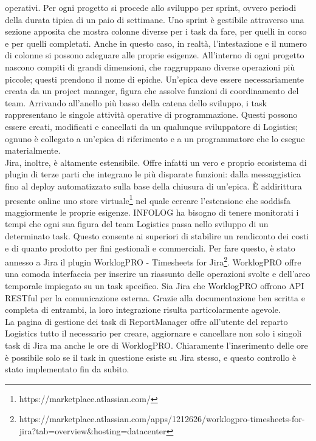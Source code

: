 operativi.
Per ogni progetto si procede allo sviluppo per sprint, ovvero periodi della durata tipica di un paio di settimane.
Uno sprint è gestibile attraverso una sezione apposita che mostra colonne diverse per i task da fare, per quelli in corso e per quelli completati.
Anche in questo caso, in realtà, l'intestazione e il numero di colonne si possono adeguare alle proprie esigenze.
All'interno di ogni progetto nascono compiti di grandi dimensioni, che raggruppano diverse operazioni più piccole; questi prendono il nome di epiche.
Un'epica deve essere necessariamente creata da un project manager, figura che assolve funzioni di coordinamento del team.
Arrivando all'anello più basso della catena dello sviluppo, i task rappresentano le singole attività operative di programmazione.
Questi possono essere creati, modificati e cancellati da un qualunque sviluppatore di Logistics; ognuno è collegato a un'epica di riferimento e a un programmatore che lo esegue
materialmente.
\\
Jira, inoltre, è altamente estensibile. Offre infatti un vero e proprio ecosistema di plugin di terze parti che integrano le più disparate funzioni: dalla messaggistica
fino al deploy automatizzato sulla base della chiusura di un'epica. È addirittura presente online uno store virtuale\footnote{https://marketplace.atlassian.com/} nel quale cercare
l'estensione che soddisfa maggiormente le proprie esigenze.
INFOLOG ha bisogno di tenere monitorati i tempi che ogni sua figura del team Logistics passa nello sviluppo di un determinato task.
Questo consente ai superiori di stabilire un rendiconto dei costi e di quanto prodotto per fini gestionali e commerciali.
Per fare questo, è stato annesso a Jira il plugin WorklogPRO - Timesheets for Jira\footnote{https://marketplace.atlassian.com/apps/1212626/worklogpro-timesheets-for-jira?tab=overview\&hosting=datacenter}.
WorklogPRO offre una comoda interfaccia per inserire un riassunto delle operazioni svolte e dell'arco temporale impiegato su un task specifico.
Sia Jira che WorklogPRO offrono API RESTful per la comunicazione esterna. Grazie alla documentazione ben scritta e completa di entrambi, la loro integrazione risulta
particolarmente agevole.
\\
La pagina di gestione dei task di ReportManager offre all'utente del reparto Logistics tutto il necessario per creare, aggiornare e cancellare non solo i singoli task di Jira ma
anche le ore di WorklogPRO.
Chiaramente l'inserimento delle ore è possibile solo se il task in questione esiste su Jira stesso, e questo controllo è stato implementato fin da subito.
